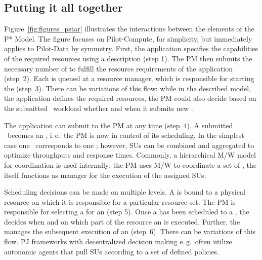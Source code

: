 \documentclass[conference]{IEEEtran}
\begin{document}
\subsection{Putting it all together}   

Figure~\ref{fig:figures_pstar} illustrates the interactions between the
elements of the P* Model.  The figure focuses on Pilot-Compute, for
simplicity, but immediately applies to Pilot-Data by symmetry.  First, the
application specifies the capabilities of the required resources using a
\pilotjob description (step 1). The PM then submits the necessary number of
\pilots to fulfill the resource requirements of the application (step~2). Each
\pilot is queued at a resource manager, which is responsible for starting
the \pilot (step~3). There can be variations of this flow: while in the
described model, the application defines the required resources, the PM could
also decide based on the submitted \cu \ workload whether and when it submits
new \pilots.


The application can submit \cus to the PM at any time (step~4). A
submitted \cu \ becomes an \su, i.\,e.\ the PM is now in control of
its scheduling. In the simplest case one \cu \ corresponds to one \su; however,
SUs can be combined and aggregated to optimize throughputs and
response times. Commonly, a hierarchical M/W model for coordination
is used internally: the PM uses M/W to coordinate a set of \pilots,
the \pilot itself functions as manager for the execution of the
assigned SUs.

Scheduling decisions can be made on multiple levels. A \pilot is bound
to a physical resource on which it is responsible for a particular
resource set. The PM is responsible for selecting a \pilot for an \su
(step 5). Once a \su has been scheduled to a \pilot, the \pilot decides
when and on which part of the resource an \su is executed.  Further,
the \pilot manages the subsequent execution of an \su (step~6).  There
can be variations of this flow.  PJ frameworks with decentralized
decision making e.\,g.\ often utilize autonomic agents that %
pull SUs according to a set of defined policies.
\end{document}
